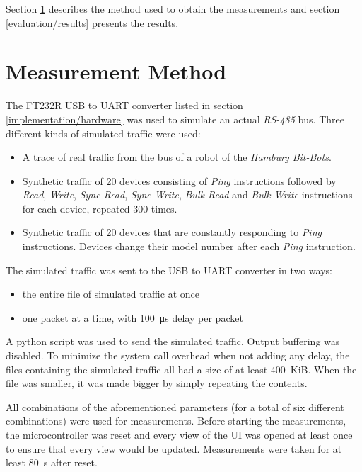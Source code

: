Section \ref{evaluation/measurement-method} describes the method used to obtain the measurements and
section \ref{evaluation/results} presents the results.

\section{Measurement Method}
\label{evaluation/measurement-method}

The FT232R USB to UART converter listed in section \ref{implementation/hardware} was used to simulate
an actual \textit{RS-485} bus. Three different kinds of simulated traffic were used:

\begin{itemize}
    \item A trace of real traffic from the bus of a robot of the \textit{Hamburg Bit-Bots}.
    \item Synthetic traffic of 20 devices consisting of \textit{Ping} instructions followed by
          \textit{Read}, \textit{Write}, \textit{Sync Read}, \textit{Sync Write}, \textit{Bulk Read}
          and \textit{Bulk Write} instructions for each device, repeated 300 times.
    \item Synthetic traffic of 20 devices that are constantly responding to \textit{Ping} instructions.
          Devices change their model number after each \textit{Ping} instruction.
\end{itemize}

The simulated traffic was sent to the USB to UART converter in two ways:

\begin{itemize}
    \item the entire file of simulated traffic at once
    \item one packet at a time, with \SI{100}{\micro\second} delay per packet
\end{itemize}

A python script was used to send the simulated traffic. Output buffering was disabled. To minimize
the system call overhead when not adding any delay, the files containing the simulated traffic all
had a size of at least \SI{400}{KiB}. When the file was smaller, it was made bigger by simply
repeating the contents.

All combinations of the aforementioned parameters (for a total of six different combinations) were
used for measurements. Before starting the measurements, the microcontroller was reset and every
view of the UI was opened at least once to ensure that every view would be updated. Measurements
were taken for at least \SI{80}{\second} after reset.

